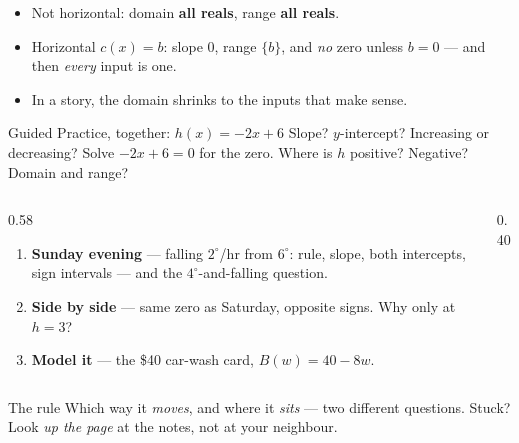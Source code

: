\documentclass[aspectratio=169, 11pt]{beamer}
\newcommand{\tempgrid}{%
  \draw[step=1, linegray!45, thin] (0,-8) grid (7,8);
  \draw[->, thick, charcoal] (0,0)--(7.6,0) node[right, font=\tiny]{$h$};
  \draw[->, thick, charcoal] (0,-8.6)--(0,8.8) node[above, font=\tiny]{$T$};
  \foreach \x in {1,...,7} \node[charcoal, font=\tiny, below] at (\x,0){\x};
  \foreach \y in {-8,-4,4,8} \node[charcoal, font=\tiny, left] at (0,\y){\y};}
\begin{document}
\begin{frame}[t, plain]
  \begin{itemize}\setlength{\itemsep}{4pt}
    \item Not horizontal: domain \textbf{all reals}, range \textbf{all reals}.
    \item Horizontal $c(x)=b$: slope $0$, range $\{b\}$, and \emph{no} zero unless $b=0$ --- and then
          \emph{every} input is one.
    \item In a story, the domain shrinks to the inputs that make sense.
  \end{itemize}
  \vspace{5pt}
  \begin{block}{Guided Practice, together: $h(x)=-2x+6$}
    Slope? \; $y$-intercept? \; Increasing or decreasing? \; Solve $-2x+6=0$ for the zero. \;
    Where is $h$ positive? Negative? \; Domain and range?
  \end{block}
\end{frame}

\begin{frame}[t, plain]
  \begin{columns}[T]
    \begin{column}{0.58\textwidth}
      \begin{enumerate}\setlength{\itemsep}{5pt}
        \item \textbf{Sunday evening} --- falling $2^\circ$/hr from $6^\circ$: rule, slope, both
              intercepts, sign intervals --- and the $4^\circ$-and-falling question.
        \item \textbf{Side by side} --- same zero as Saturday, opposite signs. Why only at $h=3$?
        \item \textbf{Model it} --- the \$40 car-wash card, $B(w)=40-8w$.
      \end{enumerate}
    \end{column}
    \begin{column}{0.40\textwidth}
      \centering
    \end{column}
  \end{columns}
  \vspace{2pt}
  \begin{block}{The rule}
    Which way it \emph{moves}, and where it \emph{sits} --- two different questions. Stuck? Look
    \emph{up the page} at the notes, not at your neighbour.
  \end{block}
\end{frame}
\end{document}
